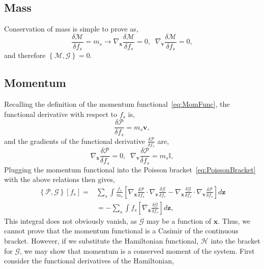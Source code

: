 \documentclass[preprint,12pt]{elsarticle}
\theoremstyle{definition}
\begin{document}
\subsection{Mass}
Conservation of mass is simple to prove as,
\begin{equation*}
    \frac{\delta \mathcal{M}}{\delta f_s} = m_s \rightarrow \nabla_{\boldsymbol{x}} \frac{\delta \mathcal{M}}{\delta f_s} = 0, \;\;\nabla_{\boldsymbol{v}} \frac{\delta \mathcal{M}}{\delta f_s} = 0,
\end{equation*}
and therefore $\left\{\mathcal{M},\mathcal{G}\right\} = 0$. 

\subsection{Momentum}

Recalling the definition of the momentum functional~\eqref{eq:MomFunc}, the functional derivative with respect to $f_s$ is,
\begin{equation*}
  \frac{\delta \mathcal{P}}{\delta f_s} = m_s \boldsymbol{v},
\end{equation*}
and the gradients of the functional derivative $\frac{\delta \mathcal{P}}{\delta f_s}$ are,
\begin{equation*}
  \nabla_{\boldsymbol{x}} \frac{\delta \mathcal{P}}{\delta f_s} = 0, \;\; \nabla_{\boldsymbol{v}} \frac{\delta \mathcal{P}}{\delta f_s} = m_s \mathbb{I},
\end{equation*}
Plugging the momentum functional into the Poisson bracket~\eqref{eq:PoissonBracket} with the above relations then gives,
\begin{align*}
  \left\{\mathcal{P},\mathcal{G}\right\} \left[f_s\right] = &\sum_s \int \frac{f_s}{m_s} \left[\nabla_{\boldsymbol{x}} \frac{\delta \mathcal{P}}{\delta f_s} \cdot \nabla_{\boldsymbol{v}} \frac{\delta \mathcal{G}}{\delta f_s} - \nabla_{\boldsymbol{x}} \frac{\delta \mathcal{G}}{\delta f_s} \cdot \nabla_{\boldsymbol{v}} \frac{\delta \mathcal{P}}{\delta f_s} \right] d\boldsymbol{z} \\
  &= -\sum_s \int f_s \left[\nabla_{\boldsymbol{x}} \frac{\delta \mathcal{G}}{\delta f_s} \right] d\boldsymbol{z},
\end{align*}
This integral does not obviously vanish, as $\mathcal{G}$ may be a function of $\boldsymbol{x}$.
Thus, we cannot prove that the momentum functional is a Casimir of the continuous bracket. However, if we substitute the Hamiltonian functional, $\mathcal{H}$ into the bracket for $\mathcal{G}$, we may show that momentum is a conserved moment of the system. First consider the functional derivatives of the Hamiltonian,
\end{document}

